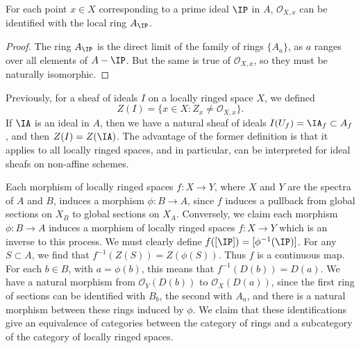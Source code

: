 \begin{theorem}
    For each point $x \in X$ corresponding to a prime ideal $\IP$ in $A$, $\mathcal{O}_{X,x}$ can be identified with the local ring $A_{\IP}$.
\end{theorem}
\begin{proof}
    The ring $A_{\IP}$ is the direct limit of the family of rings $\{ A_a \}$, as $a$ ranges over all elements of $A - \IP$. But the same is true of $\mathcal{O}_{X,x}$, so they must be naturally isomorphic.
\end{proof}

\begin{remark}
    Previously, for a sheaf of ideals $I$ on a locally ringed space $X$, we defined
    \[ Z(I) = \{ x \in X: Z_x \neq \mathcal{O}_{X,x} \}. \]
    If $\IA$ is an ideal in $A$, then we have a natural sheaf of ideals $I(U_f) = \IA_f \subset A_f$, and then $Z(I) = Z(\IA)$. The advantage of the former definition is that it applies to all locally ringed spaces, and in particular, can be interpreted for ideal sheafs on non-affine schemes.
\end{remark}

Each morphism of locally ringed spaces $f: X \to Y$, where $X$ and $Y$ are the spectra of $A$ and $B$, induces a morphism $\phi: B \to A$, since $f$ induces a pullback from global sections on $X_B$ to global sections on $X_A$. Conversely, we claim each morphism $\phi: B \to A$ induces a morphism of locally ringed spaces $f: X \to Y$ which is an inverse to this process. We must clearly define $f([\IP]) = [\phi^{-1}(\IP)]$. For any $S \subset A$, we find that $f^{-1}(Z(S)) = Z(\phi(S))$. Thus $f$ is a continuous map. For each $b \in B$, with $a = \phi(b)$, this means that $f^{-1}(D(b)) = D(a)$. We have a natural morphism from $\mathcal{O}_Y(D(b))$ to $\mathcal{O}_X(D(a))$, since the first ring of sections can be identified with $B_b$, the second with $A_a$, and there is a natural morphism between these rings induced by $\phi$. We claim that these identifications give an equivalence of categories between the category of rings and a subcategory of the category of locally ringed spaces.

